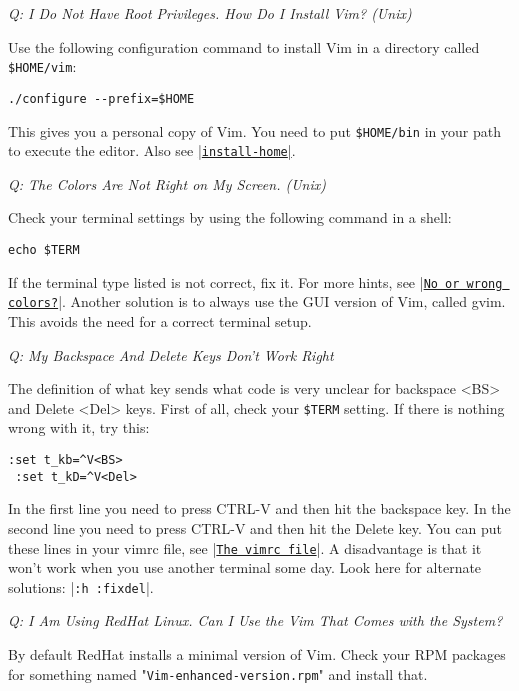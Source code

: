 \textit{Q: I Do Not Have Root Privileges.  How Do I Install Vim? (Unix)}

Use the following configuration command to install Vim in a directory called \texttt{\$HOME/vim}:

\begin{Verbatim}[samepage=true]
 ./configure --prefix=$HOME
\end{Verbatim}

This gives you a personal copy of Vim.  You need to put \texttt{\$HOME/bin} in your
path to execute the editor.  Also see \hyperref[install-home]{|\texttt{install-home}|}.

\textit{Q: The Colors Are Not Right on My Screen. (Unix)}

Check your terminal settings by using the following command in a shell:

\begin{Verbatim}[samepage=true]
 echo $TERM
\end{Verbatim}

If the terminal type listed is not correct, fix it.
For more hints, see |\hyperref[No or wrong colors?]{\texttt{No or wrong colors?}}|.
Another solution is to always use the GUI version of Vim, called gvim.
This avoids the need for a correct terminal setup.

\textit{Q: My Backspace And Delete Keys Don't Work Right}

The definition of what key sends what code is very unclear for backspace <BS> and Delete <Del> keys.
First of all, check your \texttt{\$TERM} setting.
If there is nothing wrong with it, try this:

\begin{Verbatim}[samepage=true]
 :set t_kb=^V<BS>
 :set t_kD=^V<Del>
\end{Verbatim}

In the first line you need to press CTRL-V and then hit the backspace key.
In the second line you need to press CTRL-V and then hit the Delete key.
You can put these lines in your vimrc file, see |\hyperref[The vimrc file]{\texttt{The vimrc file}}|.
A disadvantage is that it won't work when you use another terminal some day.
Look here for alternate solutions: |\texttt{:h :fixdel}|.

\textit{Q: I Am Using RedHat Linux.  Can I Use the Vim That Comes with the System?}

By default RedHat installs a minimal version of Vim.
Check your RPM packages for something named "\texttt{Vim-enhanced-version.rpm}" and install that.

